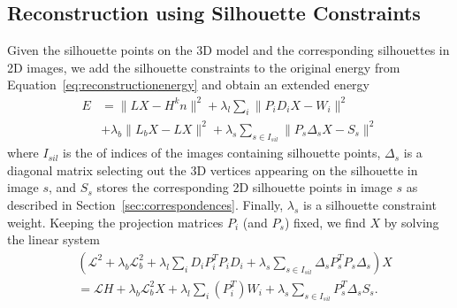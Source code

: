 % 

\subsection{Reconstruction using Silhouette Constraints}

Given the silhouette points on the 3D model and the corresponding silhouettes in 2D images, we add the silhouette constraints to the original energy from Equation~\ref{eq:reconstructionenergy} and obtain an extended energy
%
\begin{equation}
\begin{split}
E&=\|LX - H^{k}n\|^2+ \lambda_{l}\sum_{i}{\|P_{i}D_{i}X-W_{i}\|^2} \\
&+\lambda_{b}\|L_{b}X - LX\|^2+\lambda_{s} \sum_{s\in I_{sil}}{\|P_{s}\Delta_{s}X-S_{s}\|^2}
\end{split}
\end{equation} 
%
where $I_{sil}$ is the of indices of the images containing silhouette points, $\Delta_{s}$ is a diagonal matrix selecting out the 3D vertices appearing on the silhouette in image $s$, and $S_s$ stores the corresponding 2D silhouette points in image $s$ as described in Section~\ref{sec:correspondences}. Finally, $\lambda_{s}$ is a silhouette constraint weight.
Keeping the projection matrices $P_i$ (and $P_s$) fixed, we find $X$ by solving the linear system
%
\begin{equation}
\begin{split}
&(\mathcal{L}^2+\lambda_{b}\mathcal{L}_b^2 +\lambda_{l}\sum_{i}{D_{i}P_{i}^{T}P_{i}D_{i}}+\lambda_{s} \sum_{s \in I_{sil}}{\Delta_{s}P_{s}^{T}P_{s}\Delta_{s}})X\\
&=\mathcal{L}H+\lambda_{b}\mathcal{L}_b^2X+\lambda_{l}\sum_{i}{(P_{i}^T)W_{i}}+\lambda_{s}\sum_{s \in I_{sil}}{P_{s}^{T}\Delta_{s}S_{s}}.
\end{split}
\end{equation} 



